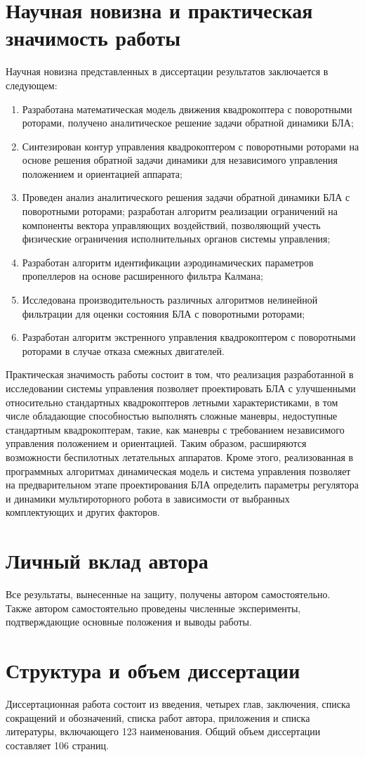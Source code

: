 \section{Научная новизна и практическая значимость работы}
Научная новизна представленных в диссертации результатов заключается в следующем:
\begin{enumerate}
	\item  Разработана математическая модель движения квадрокоптера с поворотными роторами, получено аналитическое решение задачи обратной динамики БЛА;
	\item Синтезирован контур управления квадрокоптером с поворотными роторами на основе решения обратной задачи динамики для независимого управления положением и ориентацией аппарата;
	\item  Проведен анализ аналитического решения задачи обратной динамики  БЛА с поворотными роторами; разработан алгоритм реализации ограничений на компоненты вектора управляющих воздействий, позволяющий учесть физические ограничения исполнительных органов системы управления;
	\item Разработан алгоритм идентификации аэродинамических параметров пропеллеров на основе расширенного фильтра Калмана;
	\item Исследована производительность различных алгоритмов нелинейной фильтрации для оценки состояния БЛА с поворотными роторами;
	\item Разработан алгоритм экстренного управления квадрокоптером с поворотными роторами в случае отказа  смежных двигателей.
\end{enumerate}

Практическая значимость работы состоит в том, что
реализация разработанной в исследовании системы управления позволяет проектировать БЛА с улучшенными относительно стандартных квадрокоптеров летными характеристиками, в том числе обладающие способностью 
выполнять сложные маневры, недоступные стандартным квадрокоптерам, такие, как маневры с требованием независимого управления положением и ориентацией.
Таким образом, расширяются возможности беспилотных летательных аппаратов.
Кроме этого, реализованная в программных алгоритмах динамическая модель и система управления позволяет на предварительном этапе проектирования БЛА определить параметры регулятора и динамики мультироторного робота в зависимости от выбранных комплектующих и других факторов.

\section{Личный вклад автора}
Все результаты, вынесенные на защиту, получены автором самостоятельно.
Также автором самостоятельно проведены численные эксперименты,
подтверждающие основные положения и выводы работы. 

\section{Структура и объем диссертации}
Диссертационная работа состоит из введения, четырех глав, заключения,
списка сокращений и обозначений, списка работ автора, приложения и списка литературы,
включающего 123 наименования.
Общий объем диссертации составляет 106 страниц.












